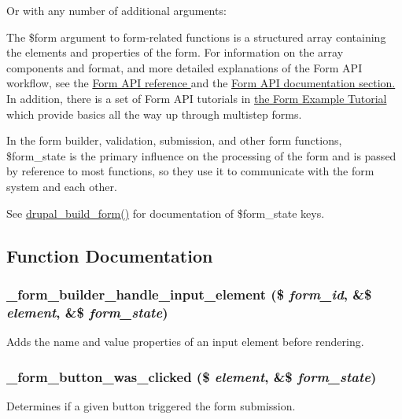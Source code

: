 Or with any number of additional arguments: 


The \$form argument to form-\/related functions is a structured array containing the elements and properties of the form. For information on the array components and format, and more detailed explanations of the Form API workflow, see the \hyperlink{}{Form API reference } and the \hyperlink{}{Form API documentation section. } In addition, there is a set of Form API tutorials in \hyperlink{}{the Form Example Tutorial } which provide basics all the way up through multistep forms.

In the form builder, validation, submission, and other form functions, \$form\_\-state is the primary influence on the processing of the form and is passed by reference to most functions, so they use it to communicate with the form system and each other.

See \hyperlink{group__form__api_gabead4b3c089fd605421d371a0315c4d7}{drupal\_\-build\_\-form()} for documentation of \$form\_\-state keys. 

\subsection{Function Documentation}
\hypertarget{group__form__api_ga908b7f94c6c9a0ef07a62466c6c196d7}{
\subsubsection[{\_\-form\_\-builder\_\-handle\_\-input\_\-element}]{\setlength{\rightskip}{0pt plus 5cm}\_\-form\_\-builder\_\-handle\_\-input\_\-element (\$ {\em form\_\-id}, \/  \&\$ {\em element}, \/  \&\$ {\em form\_\-state})}}
\label{group__form__api_ga908b7f94c6c9a0ef07a62466c6c196d7}
Adds the name and value properties of an input element before rendering. \hypertarget{group__form__api_ga3f83a917fae34f718032f4a104bc6b36}{
\subsubsection[{\_\-form\_\-button\_\-was\_\-clicked}]{\setlength{\rightskip}{0pt plus 5cm}\_\-form\_\-button\_\-was\_\-clicked (\$ {\em element}, \/  \&\$ {\em form\_\-state})}}
\label{group__form__api_ga3f83a917fae34f718032f4a104bc6b36}
Determines if a given button triggered the form submission.

